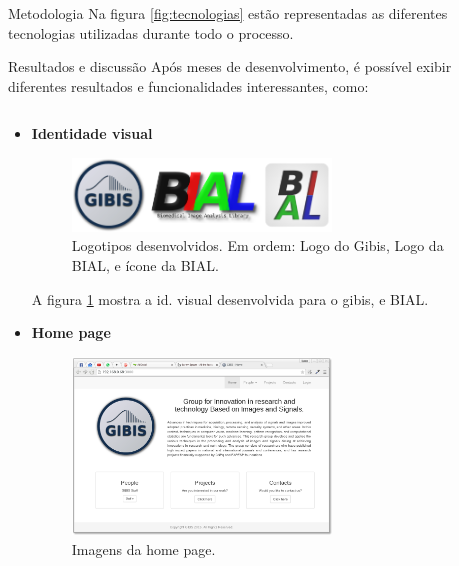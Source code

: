 \documentclass[final]{beamer} %
\begin{document}
\begin{frame}[t]
\begin{columns}[t]
\begin{column}{0.60\paperwidth}
\begin{block}{Metodologia}
		Na figura \ref{fig:tecnologias} estão representadas as diferentes tecnologias utilizadas durante todo o processo.
	\end{block}
	\begin{block}{Resultados e discussão}
	   	Após meses de desenvolvimento, é possível exibir diferentes resultados e funcionalidades interessantes, como:
		\begin{columns}[t,totalwidth=0.60\paperwidth]
			\begin{column}{0.28\paperwidth}
				\begin{itemize}
					\item {\bf Identidade visual}\\
			   		\begin{figure}[ht]
			   			\begin{center}
			   				\includegraphics[width=0.65\textwidth]{./figures/identidade}
			   				\caption{Logotipos desenvolvidos. Em ordem: Logo do Gibis, Logo da BIAL, e ícone da BIAL. \label{fig:identidade}}
			   			\end{center}
			   		\end{figure}
			   		A figura \ref{fig:identidade} mostra a id. visual desenvolvida para o gibis, e BIAL.
					\item {\bf Home page}\\
					\begin{figure}[ht]
						\begin{center}
							\includegraphics[width=0.65\textwidth]{./figures/home}
							\caption{Imagens da home page. \label{fig:home}}
						\end{center}
					\end{figure}

\end{itemize}
\end{column}
\end{columns}
\end{block}
\end{column}
\end{columns}
\end{frame}
\end{document}
